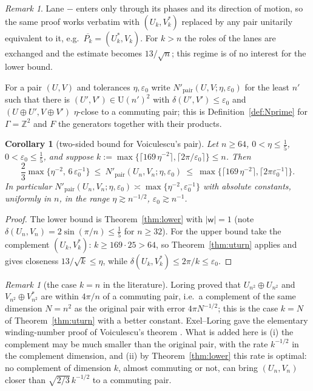 \documentclass[11pt]{amsart}
\newtheorem{corollary}[theorem]{Corollary}
\theoremstyle{definition}
\theoremstyle{remark}
\newtheorem{remark}[theorem]{Remark}
\newcommand{\Z}{\mathbb Z}
\newcommand{\wind}{\mathsf w}
\newcommand{\U}{\mathrm U}
\begin{document}
\begin{remark}
Lane $-$ enters only through its phases and its direction of motion, so the same proof works verbatim with $(U_k,V_k^*)$ replaced by any pair unitarily equivalent to it, e.g.\ $\overline{P_k}=(U_k^*,V_k)$. For $k>n$ the roles of the lanes are exchanged and the estimate becomes $13/\sqrt n$; this regime is of no interest for the lower bound.
\end{remark}

For a pair $(U,V)$ and tolerances $\eta,\varepsilon_0$ write $N'_{\mathrm{pair}}(U,V;\eta,\varepsilon_0)$ for the least $n'$ such that there is $(U',V')\in\U(n')^2$ with $\delta(U',V')\le\varepsilon_0$ and $(U\oplus U',V\oplus V')$ $\eta$-close to a commuting pair; this is Definition~\ref{def:Nprime} for $\Gamma=\Z^2$ and $F$ the generators together with their products.

\begin{corollary}[two-sided bound for Voiculescu's pair]\label{cor:sharp}
Let $n\ge64$, $0<\eta\le\frac15$, $0<\varepsilon_0\le\frac15$, and suppose $k:=\max\{\lceil169\,\eta^{-2}\rceil,\lceil2\pi/\varepsilon_0\rceil\}\le n$. Then
\[
\frac23\max\{\eta^{-2},\,6\,\varepsilon_0^{-1}\}\ \le\ N'_{\mathrm{pair}}(U_n,V_n;\eta,\varepsilon_0)\ \le\ \max\{\lceil169\,\eta^{-2}\rceil,\lceil2\pi\varepsilon_0^{-1}\rceil\}.
\]
In particular $N'_{\mathrm{pair}}(U_n,V_n;\eta,\varepsilon_0)\asymp\max\{\eta^{-2},\varepsilon_0^{-1}\}$ with absolute constants, uniformly in $n$, in the range $\eta\gtrsim n^{-1/2}$, $\varepsilon_0\gtrsim n^{-1}$.
\end{corollary}

\begin{proof}
The lower bound is Theorem~\ref{thm:lower} with $|\wind|=1$ (note $\delta(U_n,V_n)=2\sin(\pi/n)\le\frac15$ for $n\ge32$). For the upper bound take the complement $(U_k,V_k^*)$: $k\ge169\cdot25>64$, so Theorem~\ref{thm:uturn} applies and gives closeness $13/\sqrt k\le\eta$, while $\delta(U_k,V_k^*)\le2\pi/k\le\varepsilon_0$.
\end{proof}

\begin{remark}[the case $k=n$ in the literature]
Loring \cite{Lor88} proved that $U_{n^2}\oplus U_{n^2}$ and $V_{n^2}\oplus V_{n^2}^*$ are within $4\pi/n$ of a commuting pair, i.e.\ a complement of the same dimension $N=n^2$ as the original pair with error $4\pi N^{-1/2}$; this is the case $k=N$ of Theorem~\ref{thm:uturn} with a better constant. Exel--Loring \cite{EL89} gave the elementary winding-number proof of Voiculescu's theorem \cite{Voi83}. What is added here is (i) the complement may be much smaller than the original pair, with the rate $k^{-1/2}$ in the complement dimension, and (ii) by Theorem~\ref{thm:lower} this rate is optimal: no complement of dimension $k$, almost commuting or not, can bring $(U_n,V_n)$ closer than $\sqrt{2/3}\,k^{-1/2}$ to a commuting pair.
\end{remark}
\end{document}
